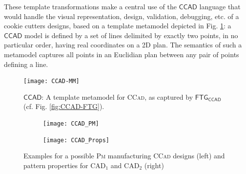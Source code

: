These template transformations make a central use of the $\mathsf{CCAD}$ 
language that would handle the visual representation, design, validation, 
debugging, etc. of a cookie cutters designs, based on a template metamodel 
depicted in Fig. \ref{fig:CCAD-MM}: a $\mathsf{CCAD}$ model is defined by a set 
of lines delimited by exactly two points, in no particular order, having real 
coordinates on a 2D plan. The semantics of such a metamodel captures all points 
in an Euclidian plan between any pair of points defining a line.

\begin{figure}[t]
\centering
\texttt{[image: CCAD-MM]}
\caption{$\mathsf{CCAD}$: A template metamodel for \textsc{CCad}, as captured
by $\mathsf{FTG_{CCAD}}$ (cf. Fig. \ref{fig:CCAD-FTG}).}
\label{fig:CCAD-MM}%
\end{figure}

\begin{figure}
\centering
\begin{subfigure}[t]{0.72\linewidth}
\centering
\texttt{[image: CCAD\_PM]}
\label{fig:CCAD-PM-Full}%
\end{subfigure}
\begin{subfigure}[t]{0.23\linewidth}
\centering
\texttt{[image: CCAD\_Props]}
\label{fig:PatternProperties}
\end{subfigure}
\caption{Examples for a possible \textsc{Pm} manufacturing 
\textsc{CCad} designs (left) and pattern properties for $\mbox{CAD}_1$ and $\mbox{CAD}_2$ (right)}
\end{figure}

